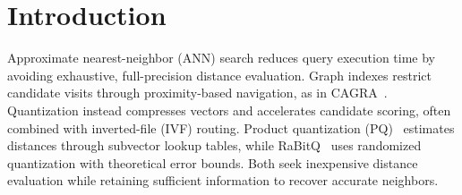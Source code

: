 





\section{Introduction}
\label{sec:introduction}
Approximate nearest-neighbor (ANN) search reduces query execution time by avoiding exhaustive, full-precision distance evaluation. Graph indexes restrict candidate visits through proximity-based navigation, as in CAGRA~\cite{cagra}. Quantization instead compresses vectors and accelerates candidate scoring, often combined with inverted-file (IVF) routing. Product quantization (PQ)~\cite{pq} estimates distances through subvector lookup tables, while RaBitQ~\cite{rabitq} uses randomized quantization with theoretical error bounds. Both seek inexpensive distance evaluation while retaining sufficient information to recover accurate neighbors.

